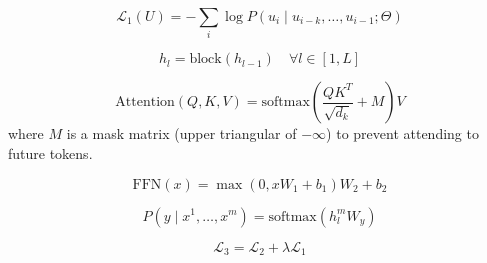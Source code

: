 
\begin{equation}
\mathcal{L}_1(U) = -\sum_{i} \log P(u_i \mid u_{i-k}, \dots, u_{i-1}; \Theta)
\end{equation}

\begin{equation}
h_l = \text{block}(h_{l-1}) \quad \forall l \in [1, L]
\end{equation}

\begin{equation}
\text{Attention}(Q, K, V) = \text{softmax}\left( \frac{QK^T}{\sqrt{d_k}} + M \right) V
\end{equation}
where \(M\) is a mask matrix (upper triangular of \(-\infty\)) to prevent attending to future tokens.

\begin{equation}
\text{FFN}(x) = \max(0, xW_1 + b_1) W_2 + b_2
\end{equation}

\begin{equation}
P(y \mid x^1, \dots, x^m) = \text{softmax}(h_l^m W_y)
\end{equation}

\begin{equation}
\mathcal{L}_3 = \mathcal{L}_2 + \lambda \mathcal{L}_1
\end{equation}